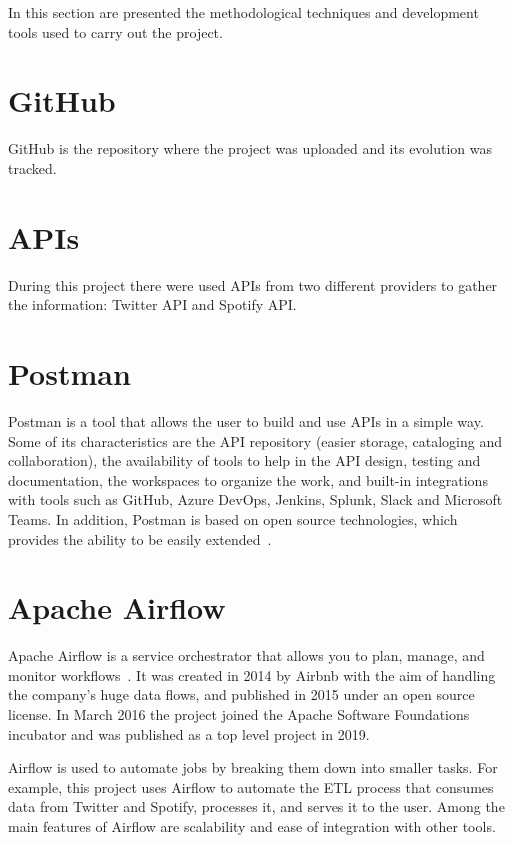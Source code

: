
\nonzeroparskip In this section are presented the methodological techniques and development tools used to carry out the project.

\section{GitHub}

\nonzeroparskip GitHub is the repository where the project was uploaded and its evolution was tracked.

\section{APIs}

\nonzeroparskip During this project there were used APIs from two different providers to gather the information: Twitter API and Spotify API.

\section{Postman}

\nonzeroparskip Postman is a tool that allows the user to build and use APIs in a simple way. Some of its characteristics are the API repository (easier storage, cataloging and collaboration), the availability of tools to help in the API design, testing and documentation, the workspaces to organize the work, and built-in integrations with tools such as GitHub, Azure DevOps, Jenkins, Splunk, Slack and Microsoft Teams. In addition, Postman is based on open source technologies, which provides the ability to be easily extended~\cite{postman}.

\section{Apache Airflow}

\nonzeroparskip Apache Airflow is a service orchestrator that allows you to plan, manage, and monitor workflows~\cite{airflow}. It was created in 2014 by Airbnb with the aim of handling the company's huge data flows, and published in 2015 under an open source license. In March 2016 the project joined the Apache Software Foundations incubator and was published as a top level project in 2019.

\nonzeroparskip Airflow is used to automate jobs by breaking them down into smaller tasks. For example, this project uses Airflow to automate the ETL process that consumes data from Twitter and Spotify, processes it, and serves it to the user. Among the main features of Airflow are scalability and ease of integration with other tools.

